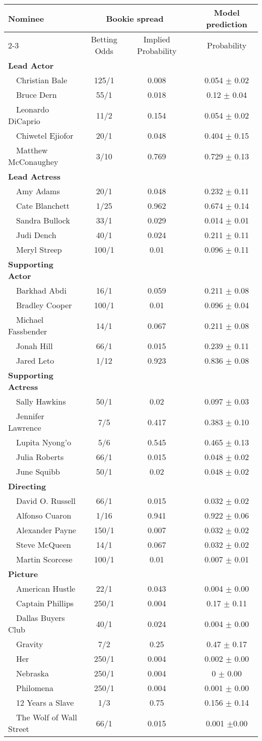 \documentclass[jou,apacite]{apa6}
\begin{document}
\begin{table*}
\caption{Full 2014 Prediction and Speculation odds}
\begin{center}
\begin{tabular}{lcccc}
\hline\hline
\multicolumn{1}{l}{\bfseries Nominee}&\multicolumn{2}{c}{\bfseries Bookie spread}&\multicolumn{1}{c}{\bfseries }&\multicolumn{1}{c}{\bfseries Model prediction}\tabularnewline
\cline{2-3} \cline{5-5}
\multicolumn{1}{l}{}&\multicolumn{1}{c}{Betting Odds}&\multicolumn{1}{c}{Implied Probability}&\multicolumn{1}{c}{}&\multicolumn{1}{c}{Probability}\tabularnewline
\hline
{\bfseries Lead Actor}&&&&\tabularnewline
~~Christian Bale&125/1&0.008&&0.054 $\pm$ 0.02\tabularnewline
~~Bruce Dern&55/1&0.018&&0.12 $\pm$ 0.04\tabularnewline
~~Leonardo DiCaprio&11/2&0.154&&0.054 $\pm$ 0.02\tabularnewline
~~Chiwetel Ejiofor&20/1&0.048&&0.404 $\pm$ 0.15\tabularnewline
~~Matthew McConaughey&3/10&0.769&&0.729 $\pm$ 0.13\tabularnewline
\hline
{\bfseries Lead Actress}&&&&\tabularnewline
~~Amy Adams&20/1&0.048&&0.232 $\pm$ 0.11\tabularnewline
~~Cate Blanchett&1/25&0.962&&0.674 $\pm$ 0.14\tabularnewline
~~Sandra Bullock&33/1&0.029&&0.014 $\pm$ 0.01\tabularnewline
~~Judi Dench&40/1&0.024&&0.211 $\pm$ 0.11\tabularnewline
~~Meryl Streep&100/1&0.01&&0.096 $\pm$ 0.11\tabularnewline
\hline
{\bfseries Supporting Actor}&&&&\tabularnewline
~~Barkhad Abdi&16/1&0.059&&0.211 $\pm$ 0.08\tabularnewline
~~Bradley Cooper&100/1&0.01&&0.096 $\pm$ 0.04\tabularnewline
~~Michael Fassbender&14/1&0.067&&0.211 $\pm$ 0.08\tabularnewline
~~Jonah Hill&66/1&0.015&&0.239 $\pm$ 0.11\tabularnewline
~~Jared Leto&1/12&0.923&&0.836 $\pm$ 0.08\tabularnewline
\hline
{\bfseries Supporting Actress}&&&&\tabularnewline
~~Sally Hawkins&50/1&0.02&&0.097 $\pm$ 0.03\tabularnewline
~~Jennifer Lawrence&7/5&0.417&&0.383 $\pm$ 0.10\tabularnewline
~~Lupita Nyong'o&5/6&0.545&&0.465 $\pm$ 0.13\tabularnewline
~~Julia Roberts&66/1&0.015&&0.048 $\pm$ 0.02\tabularnewline
~~June Squibb&50/1&0.02&&0.048 $\pm$ 0.02\tabularnewline
\hline
{\bfseries Directing}&&&&\tabularnewline
~~David O. Russell&66/1&0.015&&0.032 $\pm$ 0.02\tabularnewline
~~Alfonso Cuaron&1/16&0.941&&0.922 $\pm$ 0.06\tabularnewline
~~Alexander Payne&150/1&0.007&&0.032 $\pm$ 0.02\tabularnewline
~~Steve McQueen&14/1&0.067&&0.032 $\pm$ 0.02\tabularnewline
~~Martin Scorcese&100/1&0.01&&0.007 $\pm$ 0.01\tabularnewline
\hline
{\bfseries Picture}&&&&\tabularnewline
~~American Hustle&22/1&0.043&&0.004 $\pm$ 0.00\tabularnewline
~~Captain Phillips&250/1&0.004&&0.17 $\pm$ 0.11\tabularnewline
~~Dallas Buyers Club&40/1&0.024&&0.004 $\pm$ 0.00\tabularnewline
~~Gravity&7/2&0.25&&0.47 $\pm$ 0.17\tabularnewline
~~Her&250/1&0.004&&0.002 $\pm$ 0.00\tabularnewline
~~Nebraska&250/1&0.004&&0 $\pm$ 0.00\tabularnewline
~~Philomena&250/1&0.004&&0.001 $\pm$ 0.00\tabularnewline
~~12 Years a Slave&1/3&0.75&&0.156 $\pm$ 0.14\tabularnewline
~~The Wolf of Wall Street&66/1&0.015&&0.001 $\pm$0.00\tabularnewline
\hline
\end{tabular}\end{center}\end{table*}


\nocite{*}


\end{document}
